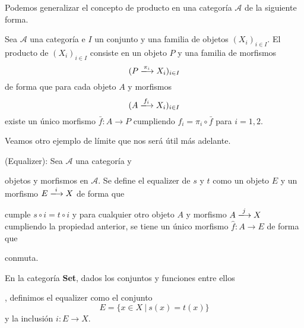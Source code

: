 Podemos generalizar el concepto de producto en una categoría $\mathscr{A}$ de la siguiente forma.

\begin{definicion}
    Sea $\mathscr{A}$ una categoría e $I$ un conjunto y una familia de objetos $(X_i)_{i\in I}$. El producto de $(X_i)_{i\in I}$ consiste en un objeto $P$ y una familia de morfismos \begin{equation}
        (P \xlongrightarrow{\pi_i} X_i)_{i \in I}
    \end{equation}
    de forma que para cada objeto $A$ y morfismos \begin{equation}
        (A \xlongrightarrow{f_i} X_i)_{i \in I}
    \end{equation}
    existe un único morfismo $\bar{f}: A \longrightarrow P$ cumpliendo $f_i = \pi_i \circ \bar{f}$ para $i=1,2$.
\end{definicion}

Veamos otro ejemplo de límite que nos será útil más adelante. 

\begin{definicion}
    (Equalizer): Sea $\mathscr{A}$ una categoría y  objetos y morfismos en $\mathscr{A}$. Se define el equalizer de $s$ y $t$ como un objeto $E$ y un morfismo $E \xlongrightarrow{i} X$ de forma que   cumple $s \circ i = t \circ i$ y para cualquier otro objeto $A$ y morfismo $A \xlongrightarrow{j} X$ cumpliendo la propiedad anterior, se tiene un único morfismo $\hat{f}: A \longrightarrow E$ de forma que

    \begin{center}
    \end{center}
    conmuta.
\end{definicion}

\begin{ejemplo}
    En la categoría \textbf{Set}, dados los conjuntos y funciones entre ellos , definimos el equalizer como el conjunto \begin{equation}
        E = \{x \in X \ | \ s(x) = t(x)\}
    \end{equation} y la inclusión $i: E \longrightarrow X$. 
\end{ejemplo}

